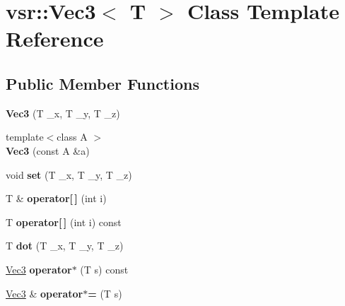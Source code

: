 \hypertarget{classvsr_1_1_vec3}{\section{vsr\-:\-:Vec3$<$ T $>$ Class Template Reference}
\label{classvsr_1_1_vec3}
}
\subsection*{Public Member Functions}
\begin{DoxyCompactItemize}
\item 
\hypertarget{classvsr_1_1_vec3_a28e4097042ad446bf9a0e3db5a81f630}{{\bfseries Vec3} (T \-\_\-x, T \-\_\-y, T \-\_\-z)}\label{classvsr_1_1_vec3_a28e4097042ad446bf9a0e3db5a81f630}

\item 
\hypertarget{classvsr_1_1_vec3_a9844773ef0ccf903b34c21a10ca9a6e7}{{\footnotesize template$<$class A $>$ }\\{\bfseries Vec3} (const A \&a)}\label{classvsr_1_1_vec3_a9844773ef0ccf903b34c21a10ca9a6e7}

\item 
\hypertarget{classvsr_1_1_vec3_adee4b09c3fb0ec67a68d16142e589e53}{void {\bfseries set} (T \-\_\-x, T \-\_\-y, T \-\_\-z)}\label{classvsr_1_1_vec3_adee4b09c3fb0ec67a68d16142e589e53}

\item 
\hypertarget{classvsr_1_1_vec3_a191f624e86b24d5396ef98806bc639be}{T \& {\bfseries operator\mbox{[}$\,$\mbox{]}} (int i)}\label{classvsr_1_1_vec3_a191f624e86b24d5396ef98806bc639be}

\item 
\hypertarget{classvsr_1_1_vec3_ad3600562342da64fa2dc2476c7fb6634}{T {\bfseries operator\mbox{[}$\,$\mbox{]}} (int i) const }\label{classvsr_1_1_vec3_ad3600562342da64fa2dc2476c7fb6634}

\item 
\hypertarget{classvsr_1_1_vec3_a06b6087bde686881377e61a042eb808c}{T {\bfseries dot} (T \-\_\-x, T \-\_\-y, T \-\_\-z)}\label{classvsr_1_1_vec3_a06b6087bde686881377e61a042eb808c}

\item 
\hypertarget{classvsr_1_1_vec3_aa0a403602c0f3ed09ecfb183eaafaf08}{\hyperlink{classvsr_1_1_vec3}{Vec3} {\bfseries operator$\ast$} (T s) const }\label{classvsr_1_1_vec3_aa0a403602c0f3ed09ecfb183eaafaf08}

\item 
\hypertarget{classvsr_1_1_vec3_aa7e28f5835d60fd9ad87254c6b301c73}{\hyperlink{classvsr_1_1_vec3}{Vec3} \& {\bfseries operator$\ast$=} (T s)}\label{classvsr_1_1_vec3_aa7e28f5835d60fd9ad87254c6b301c73}


\end{DoxyCompactItemize}
